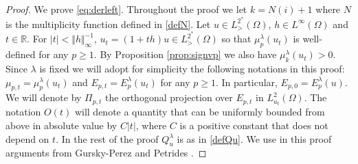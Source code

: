 \documentclass[10pt]{amsart}
\numberwithin{equation}{section}
\newcommand{\R}{\mathbb{R}}
\newcommand{\Om}{\Omega}
\newcommand{\mkl}{\mu_{k}^{\lambda}}
\newcommand{\mpl}{\mu_{p}^{\lambda}}
\theoremstyle{plain}
\theoremstyle{remark}
\begin{document}
\begin{proof}
We prove \eqref{eq:derleft}. Throughout the proof we let $k = N(i)+1$ where $N$ is the multiplicity function defined in \eqref{defN}. Let $u\in L^{2^*}_{>}(\Om)$, $h \in L^\infty(\Om)$ and $t \in \R$. For $|t|< \Vert h \Vert_{\infty}^{-1}$, $u_t = (1+th)u \in L^{2^*}_{>}(\Om)$ so that $\mu_p^{\lambda}(u_t)$ is well-defined for any $p \ge 1$. By Proposition \ref{prop:signvp} we also have $\mkl(u_t)>0$. Since $\lambda$ is fixed we will adopt for simplicity the following notations in this proof: $\mu_{p,t} = \mpl(u_t)$ and $E_{p,t} = E_p^{\lambda}(u_t)$ for any $p \ge1$. In particular, $E_{p,0} = E_p^{\lambda}(u)$. We will denote by $\Pi_{p,t}$ the orthogonal projection over $E_{p,t}$ in $L^2_{u_t}(\Om)$. The notation $O(t)$ will denote a quantity that can be uniformly bounded from above in absolute value by $C|t|$, where $C$ is a positive constant that does not depend on $t$. In the rest of the proof $Q_u^{\lambda}$ is as in \eqref{defQu}. We use in this proof arguments from  Gursky-Perez \cite{GurskyPerez} and Petrides \cite{Petrides2}. 

\medskip


\end{proof}
\end{document}
